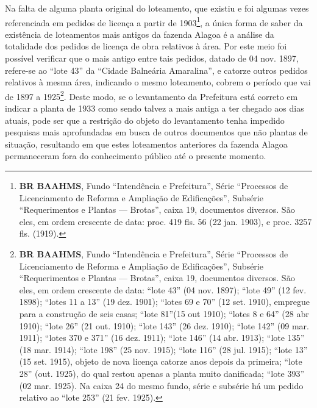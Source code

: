 Na falta de alguma planta original do loteamento, que existiu e foi algumas vezes referenciada em pedidos de licença a partir de 1903\footnote{\textbf{BR BAAHMS}, Fundo ``Intendência e Prefeitura'', Série ``Processos de Licenciamento de Reforma e Ampliação de Edificações'', Subsérie ``Requerimentos e Plantas --- Brotas'', caixa 19, documentos diversos. São eles, em ordem crescente de data: proc. 419 fls. 56 (22 jan. 1903), e proc. 3257 fls. (1919).}, a única forma de saber da existência de loteamentos mais antigos da fazenda Alagoa é a análise da totalidade dos pedidos de licença de obra relativos à área. Por este meio foi possível verificar que o mais antigo entre tais pedidos, datado de 04 nov. 1897, refere-se ao ``lote 43'' da ``Cidade Balneária Amaralina'', e catorze outros pedidos relativos à mesma área, indicando o mesmo loteamento, cobrem o período que vai de 1897 a 1925\footnote{\textbf{BR BAAHMS}, Fundo ``Intendência e Prefeitura'', Série ``Processos de Licenciamento de Reforma e Ampliação de Edificações'', Subsérie ``Requerimentos e Plantas --- Brotas'', caixa 19, documentos diversos. São eles, em ordem crescente de data: ``lote 43'' (04 nov. 1897); ``lote 49'' (12 fev. 1898); ``lotes 11 a 13'' (19 dez. 1901); ``lotes 69 e 70'' (12 set. 1910), empregue para a construção de seis casas; ``lote 81''(15 out 1910); ``lotes 8 e 64'' (28 abr 1910); ``lote 26'' (21 out. 1910); ``lote 143'' (26 dez. 1910); ``lote 142'' (09 mar. 1911); ``lotes 370 e 371'' (16 dez. 1911); ``lote 146'' (14 abr. 1913); ``lote 135'' (18 mar. 1914); ``lote 198'' (25 nov. 1915); ``lote 116'' (28 jul. 1915); ``lote 13'' (15 set. 1915), objeto de nova licença catorze anos depois da primeira; ``lote 28'' (out. 1925), do qual restou apenas a planta muito danificada; ``lote 393'' (02 mar. 1925). Na caixa 24 do mesmo fundo, série e subsérie há um pedido relativo ao ``lote 253'' (21 fev. 1925).}. Deste modo, se o levantamento da Prefeitura está correto em indicar a planta de 1933 como sendo talvez a mais antiga a ter chegado aos dias atuais, pode ser que a restrição do objeto do levantamento tenha impedido pesquisas mais aprofundadas em busca de outros documentos que não plantas de situação, resultando em que estes loteamentos anteriores da fazenda Alagoa permaneceram fora do conhecimento público até o presente momento.

